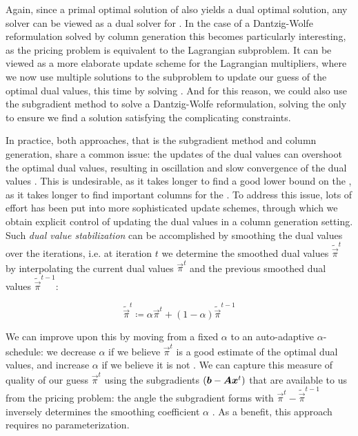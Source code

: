 Again, since a primal optimal solution of \IP{} also yields a dual optimal solution, any \IP{} solver can be viewed as a dual solver for \LDP{}. In the case of a Dantzig-Wolfe reformulation solved by column generation this becomes particularly interesting, as the pricing problem is equivalent to the Lagrangian subproblem. It can be viewed as a more elaborate update scheme for the Lagrangian multipliers, where we now use multiple solutions to the subproblem to update our guess of the optimal dual values, this time by solving \MP{} \cite{thebook}. And for this reason, we could also use the subgradient method to solve a Dantzig-Wolfe reformulation, solving the \MP{} only to ensure we find a solution satisfying the complicating constraints.

In practice, both approaches, that is the subgradient method and column generation, share a common issue: the updates of the dual values can overshoot the optimal dual values, resulting in oscillation and slow convergence of the dual values \cite{thebook, pessoa2013out, bastubbe2018computational}. This is undesirable, as it takes longer to find a good lower bound on the \IP{}, as it takes longer to find important columns for the \MP{}. To address this issue, lots of effort has been put into more sophisticated update schemes, through which we obtain explicit control of updating the dual values in a column generation setting. Such \textit{dual value stabilization} can be accomplished by smoothing the dual values over the iterations, i.e. at iteration $t$ we determine the smoothed dual values $\widetilde{\vec{\pi}}^t$ by interpolating the current dual values $\vec{\pi}^{t}$ and the previous smoothed dual values $\widetilde{\vec{\pi}}^{t-1}$:

\begin{equation*}
\widetilde{\vec{\pi}}^t \coloneqq \alpha \vec{\pi}^{t} + (1 - \alpha) \widetilde{\vec{\pi}}^{t-1}
\end{equation*}

We can improve upon this by moving from a fixed $\alpha$ to an auto-adaptive $\alpha$-schedule: we decrease $\alpha$ if we believe $\vec{\pi}^{t}$ is a good estimate of the optimal dual values, and increase $\alpha$ if we believe it is not \cite{pessoa2013out,pessoa2018automation}. We can capture this measure of quality of our guess $\vec{\pi}^{t}$ using the subgradients $\left( {\bm{b}} - {\bm{A}} {\bm{x}}^t \right)$ that are available to us from the pricing problem: the angle the subgradient forms with $\vec{\pi}^{t} - \widetilde{\vec{\pi}}^{t-1}$ inversely determines the smoothing coefficient $\alpha$ \cite{pessoa2013out,pessoa2018automation}. As a benefit, this approach requires no parameterization.

